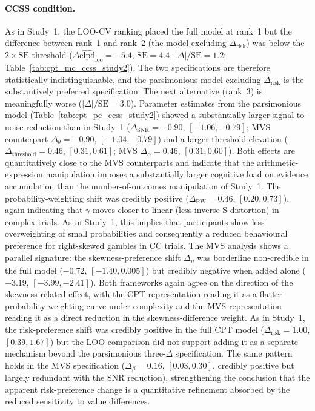\documentclass[man,floatsintext]{apa7}
\begin{document}
\paragraph{CCSS condition.} As in Study~1, the LOO-CV ranking placed the full model at rank~1 but the difference between rank~1 and rank~2 (the model excluding $\Delta_{\text{risk}}$) was below the $2 \times \mathrm{SE}$ threshold ($\Delta\widehat{\mathrm{elpd}}_{\mathrm{loo}} = -5.4$, $\mathrm{SE} = 4.4$, $|\Delta|/\mathrm{SE} = 1.2$; Table~\ref{tab:cpt_mc_ccss_study2}). The two specifications are therefore statistically indistinguishable, and the parsimonious model excluding $\Delta_{\text{risk}}$ is the substantively preferred specification. The next alternative (rank~3) is meaningfully worse ($|\Delta|/\mathrm{SE} = 3.0$). Parameter estimates from the parsimonious model (Table~\ref{tab:cpt_pe_ccss_study2}) showed a substantially larger signal-to-noise reduction than in Study~1 (\textbf{$\Delta_{\text{SNR}} = -0.90$}, $[-1.06, -0.79]$; MVS counterpart $\Delta_\theta = -0.90$, $[-1.04, -0.79]$) and a larger threshold elevation (\textbf{$\Delta_{\text{threshold}} = 0.46$}, $[0.31, 0.61]$; MVS $\Delta_\alpha = 0.46$, $[0.31, 0.60]$). Both effects are quantitatively close to the MVS counterparts and indicate that the arithmetic-expression manipulation imposes a substantially larger cognitive load on evidence accumulation than the number-of-outcomes manipulation of Study~1. The probability-weighting shift was credibly positive (\textbf{$\Delta_{\text{PW}} = 0.46$}, $[0.20, 0.73]$), again indicating that $\gamma$ moves closer to linear (less inverse-S distortion) in complex trials. As in Study~1, this implies that participants show less overweighting of small probabilities and consequently a reduced behavioural preference for right-skewed gambles in CC trials. The MVS analysis shows a parallel signature: the skewness-preference shift $\Delta_\eta$ was borderline non-credible in the full model ($-0.72$, $[-1.40, 0.005]$) but credibly negative when added alone ($-3.19$, $[-3.99, -2.41]$). Both frameworks again agree on the direction of the skewness-related effect, with the CPT representation reading it as a flatter probability-weighting curve under complexity and the MVS representation reading it as a direct reduction in the skewness-difference weight. As in Study~1, the risk-preference shift was credibly positive in the full CPT model ($\Delta_{\text{risk}} = 1.00$, $[0.39, 1.67]$) but the LOO comparison did not support adding it as a separate mechanism beyond the parsimonious three-$\Delta$ specification. The same pattern holds in the MVS specification ($\Delta_\beta = 0.16$, $[0.03, 0.30]$, credibly positive but largely redundant with the SNR reduction), strengthening the conclusion that the apparent risk-preference change is a quantitative refinement absorbed by the reduced sensitivity to value differences.
\end{document}
